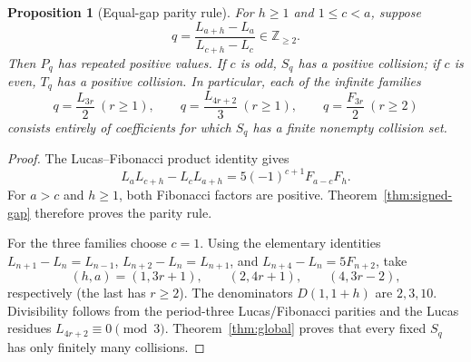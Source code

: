 \documentclass[11pt]{article}
\newtheorem{proposition}[theorem]{Proposition}
\begin{document}
\begin{proposition}[Equal-gap parity rule]\label{prop:equal-gap}
For \(h\ge1\) and \(1\le c<a\), suppose
\[
q=\frac{L_{a+h}-L_a}{L_{c+h}-L_c}
\in\mathbb Z_{\ge2}.
\]
Then \(P_q\) has repeated positive values.
If \(c\) is odd, \(S_q\) has a positive collision;
if \(c\) is even, \(T_q\) has a positive collision.
In particular, each of the infinite families
\[
\boxed{\quad
q=\frac{L_{3r}}2\ (r\ge1),\qquad
q=\frac{L_{4r+2}}3\ (r\ge1),\qquad
q=\frac{F_{3r}}2\ (r\ge2)
\quad}
\]
consists entirely of coefficients for which
\(S_q\) has a finite nonempty collision set.
\end{proposition}
\begin{proof}
The Lucas--Fibonacci product identity gives
\begin{equation}\label{eq:gap-determinant}
\boxed{\quad
L_aL_{c+h}-L_cL_{a+h}
=5(-1)^{c+1}F_{a-c}F_h.\quad}
\end{equation}
For \(a>c\) and \(h\ge1\), both Fibonacci
factors are positive. Theorem~\ref{thm:signed-gap}
therefore proves the parity rule.

For the three families choose \(c=1\).
Using the elementary identities
\(L_{n+1}-L_n=L_{n-1}\),
\(L_{n+2}-L_n=L_{n+1}\), and
\(L_{n+4}-L_n=5F_{n+2}\), take
\[
(h,a)=(1,3r+1),\qquad
(2,4r+1),\qquad
(4,3r-2),
\]
respectively (the last has \(r\ge2\)).
The denominators \(D(1,1+h)\) are \(2,3,10\).
Divisibility follows from the period-three
Lucas/Fibonacci parities and the Lucas residues
\(L_{4r+2}\equiv0\pmod3\).
Theorem~\ref{thm:global} proves that every
fixed \(S_q\) has only finitely many collisions.
\end{proof}
\end{document}
